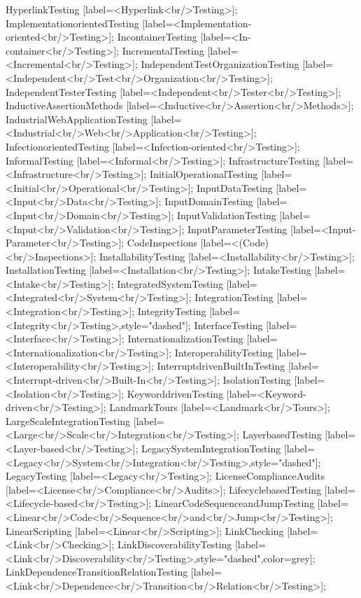 \documentclass{article}
\begin{document}
{HyperlinkTesting [label=<Hyperlink<br/>Testing>];
ImplementationorientedTesting [label=<Implementation-oriented<br/>Testing>];
IncontainerTesting [label=<In-container<br/>Testing>];
IncrementalTesting [label=<Incremental<br/>Testing>];
IndependentTestOrganizationTesting [label=<Independent<br/>Test<br/>Organization<br/>Testing>];
IndependentTesterTesting [label=<Independent<br/>Tester<br/>Testing>];
InductiveAssertionMethods [label=<Inductive<br/>Assertion<br/>Methods>];
IndustrialWebApplicationTesting [label=<Industrial<br/>Web<br/>Application<br/>Testing>];
InfectionorientedTesting [label=<Infection-oriented<br/>Testing>];
InformalTesting [label=<Informal<br/>Testing>];
InfrastructureTesting [label=<Infrastructure<br/>Testing>];
InitialOperationalTesting [label=<Initial<br/>Operational<br/>Testing>];
InputDataTesting [label=<Input<br/>Data<br/>Testing>];
InputDomainTesting [label=<Input<br/>Domain<br/>Testing>];
InputValidationTesting [label=<Input<br/>Validation<br/>Testing>];
InputParameterTesting [label=<Input-Parameter<br/>Testing>];
CodeInspections [label=<(Code)<br/>Inspections>];
InstallabilityTesting [label=<Installability<br/>Testing>];
InstallationTesting [label=<Installation<br/>Testing>];
IntakeTesting [label=<Intake<br/>Testing>];
IntegratedSystemTesting [label=<Integrated<br/>System<br/>Testing>];
IntegrationTesting [label=<Integration<br/>Testing>];
IntegrityTesting [label=<Integrity<br/>Testing>,style="dashed"];
InterfaceTesting [label=<Interface<br/>Testing>];
InternationalizationTesting [label=<Internationalization<br/>Testing>];
InteroperabilityTesting [label=<Interoperability<br/>Testing>];
InterruptdrivenBuiltInTesting [label=<Interrupt-driven<br/>Built-In<br/>Testing>];
IsolationTesting [label=<Isolation<br/>Testing>];
KeyworddrivenTesting [label=<Keyword-driven<br/>Testing>];
LandmarkTours [label=<Landmark<br/>Tours>];
LargeScaleIntegrationTesting [label=<Large<br/>Scale<br/>Integration<br/>Testing>];
LayerbasedTesting [label=<Layer-based<br/>Testing>];
LegacySystemIntegrationTesting [label=<Legacy<br/>System<br/>Integration<br/>Testing>,style="dashed"];
LegacyTesting [label=<Legacy<br/>Testing>];
LicenseComplianceAudits [label=<License<br/>Compliance<br/>Audits>];
LifecyclebasedTesting [label=<Lifecycle-based<br/>Testing>];
LinearCodeSequenceandJumpTesting [label=<Linear<br/>Code<br/>Sequence<br/>and<br/>Jump<br/>Testing>];
LinearScripting [label=<Linear<br/>Scripting>];
LinkChecking [label=<Link<br/>Checking>];
LinkDiscoverabilityTesting [label=<Link<br/>Discoverability<br/>Testing>,style="dashed",color=grey];
LinkDependenceTransitionRelationTesting [label=<Link<br/>Dependence<br/>Transition<br/>Relation<br/>Testing>];
}
\end{document}
